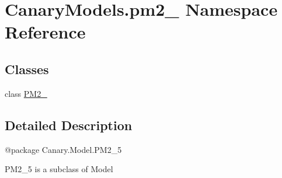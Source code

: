 \hypertarget{namespace_canary_models_1_1pm2__5}{\section{Canary\-Models.\-pm2\-\_ Namespace Reference}
\label{namespace_canary_models_1_1pm2__5}
}
\subsection*{Classes}
\begin{DoxyCompactItemize}
\item 
class \hyperlink{class_canary_models_1_1pm2__5_1_1_p_m2__5}{P\-M2\-\_}
\end{DoxyCompactItemize}


\subsection{Detailed Description}
\begin{DoxyVerb}@package Canary.Model.PM2_5

PM2_5 is a subclass of Model
\end{DoxyVerb}
 